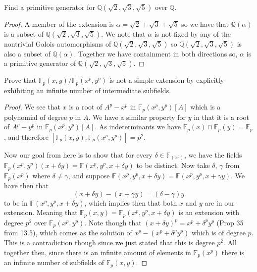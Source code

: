 \documentclass[11pt]{article}
\newenvironment{problem}[2][Problem\!]{\begin{tcolorbox}\begin{trivlist}
\item[\hskip \labelsep {\bfseries #1}\hskip \labelsep {\bfseries #2}]}{\end{trivlist}\end{tcolorbox}}
\newcommand{\qq}{\mathbb Q}   %
\newcommand{\ff}{\mathbb F}   %
\begin{document}
\vspace*{15pt}

\begin{problem}{14.4.2}
    Find a primitive generator for $\qq(\sqrt{2}, \sqrt{3}, \sqrt{5})$ over $\qq$.
\end{problem}
\begin{proof}
    A member of the extension is $\alpha = \sqrt{2} + \sqrt{3} + \sqrt{5}$ so we have that $\qq(\alpha)$ is a subset of  $\qq(\sqrt{2}, \sqrt{3}, \sqrt{5})$. We note that $\alpha$ is not fixed by any of the nontrivial Galois automorphisms of $\qq(\sqrt{2}, \sqrt{3}, \sqrt{5})$ so $\qq(\sqrt{2}, \sqrt{3}, \sqrt{5})$ is also a subset of $\qq(\alpha)$. Together we have containment in both directions so, $\alpha$ is a primitive generator of $\qq(\sqrt{2}, \sqrt{3}, \sqrt{5})$.
\end{proof}

\vspace*{15pt}

\begin{problem}{14.4.6}
    Prove that $\ff_p(x,y)/\ff_p(x^{p},y^{p})$ is not a simple extension by explicitly exhibiting an infinite number of intermediate subfields. 
\end{problem}
\begin{proof}
    We see that $x$ is a root of $A^{p} - x^{p}$ in $\ff_p(x^{p},y^{p})[A]$ which is a polynomial of degree $p$ in $A$. We have a similar property for $y$ in that it is a root of $A^{p} - y^{p} $ in $\ff_p(x^{p}, y^{p})[A]$. As indeterminants we have $\ff_p(x) \cap \ff_p(y) = \ff_p$, and therefore $[\ff_p(x,y) : \ff_p(x^{p}, y^{p})] = p^{2}$.

    Now our goal from here is to show that for every $\delta \in \ff_(x^{p})$, we have the fields $\ff_p(x^{p}, y^{p})(x + \delta y) = \ff(x^{p},y^{p}, x + \delta y)$ to be distinct. Now take $\delta$, $\gamma$ from $\ff_p(x^{p})$ where $\delta \neq \gamma$, and suppose $\ff(x^{p}, y^{p}, x + \delta y) = \ff(x^{p}, y^{p}, x + \gamma y)$. We have then that 
    \[(x + \delta y) - (x + \gamma y) = (\delta - \gamma)y\] 
    to be in $\ff(x^{p}, y^{p}, x + \delta y)$, which implies then that both $x$ and $y$ are in our extension. Meaning that $\ff_p(x,y) = \ff_p(x^{p}, y^{p}, x + \delta y) $ is an extension with degree $p^{2}$ over $\ff_p(x^{p}, y^{p})$. Note though that $(x + \delta y)^{p} = x^{p} + \delta^{p} y^{p}$ (Prop 35 from 13.5), which comes as the solution of $x^{p} - (x^{p} + \delta^{p} y^{p})$ which is of degree $p$. This is a contradiction though since we just stated that this is degree $p^{2}$. All together then, since there is an infinite amount of elements in $\ff_p(x^{p})$ there is an infinite number of subfields of $\ff_p(x,y)$. 
\end{proof}

\vspace*{15pt}
\end{document}
